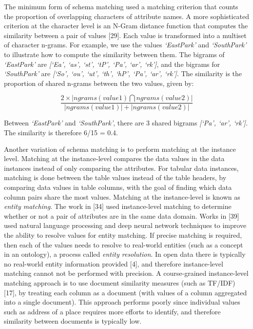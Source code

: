 The minimum form of schema matching used a matching criterion that counts the proportion of overlapping characters of attribute names. A more sophisticated criterion at the character level is an N-Gram distance function that computes the similarity between a pair of values \cite{loper-bird-2002-nltk}[29]. Each value is transformed into a multiset of character n-grams. For example, we use the values \textit{`EastPark'} and \textit{`SouthPark'} to illustrate how to compute the similarity between them. The bigrams of \textit{`EastPark'} are \textit{[`Ea', `as', `st', `tP', `Pa', `ar', `rk']}, and the bigrams for \textit{`SouthPark'} are \textit{[`So', `ou', `ut', `th', `hP', `Pa', `ar', `rk']}. The similarity is the proportion of shared n-grams between the two values, given by:

\[
\frac{2\times|ngrams(value1)\bigcap ngrams(value2)|}{|ngrams(value1)|+|ngrams(value2)|}
\]

Between \textit{`EastPark'} and \textit{`SouthPark'}, there are 3 shared bigrams \textit{[`Pa', `ar', `rk']}. The similarity is therefore 6/15 = 0.4.

Another variation of schema matching is to perform matching at the instance level. Matching at the instance-level compares the data values in the data instances instead of only comparing the attributes. For tabular data instances, matching is done between the table values instead of the table headers, by comparing data values in table columns, with the goal of finding which data column pairs share the most values. Matching at the instance-level is known as \textit{entity matching}. The work in \cite{Mudgal2018Deep}[34] used instance-level matching to determine whether or not a pair of attributes are in the same data domain. Works in \cite{Rahm2016Case}[39] used natural language processing and deep neural network techniques to improve the ability to resolve values for entity matching. If precise matching is required, then each of the values needs to resolve to real-world entities (such as a concept in an ontology), a process called \textit{entity resolution}. In open data there is typically no real-world entity information provided \cite{books/sp/bellahsene11}[4], and therefore instance-level matching cannot not be performed with precision. A course-grained instance-level matching approach is to use document similarity measures (such as TF/IDF) \cite{Duchateau2009YAM}[17], by treating each column as a document (with values of a column aggregated into a single document). This approach performs poorly since individual values such as address of a place requires more efforts to identify, and therefore similarity between documents is typically low. 

